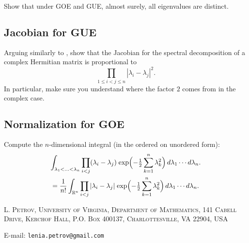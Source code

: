 \documentclass[letterpaper,11pt,oneside,reqno]{article}
\numberwithin{equation}{section}
\newcommand{\ssp}{\hspace{1pt}}
\theoremstyle{definition}
\begin{document}
Show that under GOE and GUE, almost surely,
all eigenvalues are distinct.

\subsection{Jacobian for GUE}
\label{prob:Jacobian-GUE}

Arguing similarly to 
,
show that the Jacobian for the spectral decomposition
of a complex Hermitian matrix is proportional to
\begin{equation*}
	\prod_{1\le i<j\le n}|\lambda_i-\lambda_j|^2.
\end{equation*}
In particular, make sure you understand 
where the factor $2$ comes from in the complex case.

\subsection{Normalization for GOE}
\label{prob:GOE-normalization}

Compute the $n$-dimensional integral
(in the ordered on unordered form):
\begin{multline*}
	\int_{\lambda_1<\ldots<\lambda_n } \prod_{i<j}(\lambda_i-\lambda_j)
	\ssp
	\exp\Bigl(-\tfrac{1}{2}\sum_{k=1}^n \lambda_k^2\Bigr)\,d\lambda_1\cdots d\lambda_n.\\=
	\frac{1}{n!}
	\int_{\mathbb{R}^n}
	\prod_{i<j}|\lambda_i-\lambda_j|\ssp
	\exp\Bigl(-\tfrac{1}{2}\sum_{k=1}^n \lambda_k^2\Bigr)\,d\lambda_1\cdots d\lambda_n.
\end{multline*}


































\medskip

\textsc{L. Petrov, University of Virginia, Department of Mathematics, 141 Cabell Drive, Kerchof Hall, P.O. Box 400137, Charlottesville, VA 22904, USA}

E-mail: \texttt{lenia.petrov@gmail.com}
\end{document}
